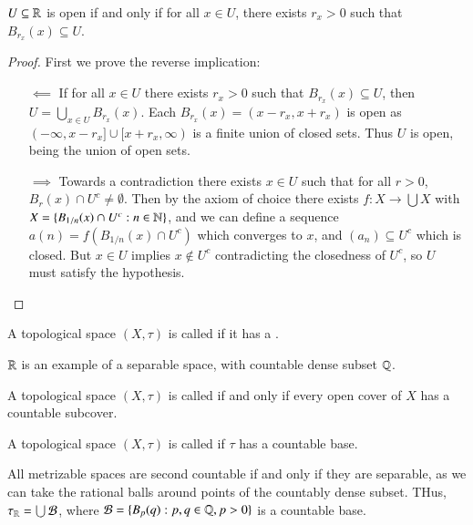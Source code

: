 \begin{prop}
    $U \subseteq \mathbb R$ is open if and only if for all $x \in U$, there exists $r_x > 0$ such that $B_{r_x}(x) \subseteq U$.
\end{prop}
\begin{proof}
    First we prove the reverse implication: \begin{itemize}
        \item[$\impliedby$] If for all $x \in U$ there exists $r_x > 0$ such that $B_{r_x}(x) \subseteq U$, then $U = \bigcup_{x \in U}B_{r_x}(x)$. Each $B_{r_x}(x) = (x-r_x,x+r_x)$ is open as $(-\infty,x-r_x]\cup[x+r_x,\infty)$ is a finite union of closed sets. Thus $U$ is open, being the union of open sets.
        \item[$\implies$] Towards a contradiction there exists $x \in U$ such that for all $r > 0$, $B_r(x) \cap U^c \neq \emptyset$. Then by the axiom of choice there exists $f:X\rightarrow \bigcup X$ with $X = \{B_{1/n}(x)\cap U^c:n \in \mathbb N\}$, and we can define a sequence $a(n) = f(B_{1/n}(x)\cap U^c)$ which converges to $x$, and $(a_n) \subseteq U^c$ which is closed. But $x \in U$ implies $x \notin U^c$ contradicting the closedness of $U^c$, so $U$ must satisfy the hypothesis.
    \end{itemize}
\end{proof}

\begin{defn}
    A topological space $(X,\tau)$ is called  if it has a .
\end{defn}

$\mathbb R$ is an example of a separable space, with countable dense subset $\mathbb Q$.

\begin{defn}
    A topological space $(X,\tau)$ is called  if and only if every open cover of $X$ has a countable subcover.
\end{defn}

\begin{defn}
    A topological space $(X,\tau)$ is called  if $\tau$ has a countable base.
\end{defn}

All metrizable spaces are second countable if and only if they are separable, as we can take the rational balls around points of the countably dense subset. THus, $\tau_{\mathbb R} = \bigcup \mathcal{B}$, where $\mathcal{B} = \{B_p(q):p,q \in \mathbb Q, p > 0\}$ is a countable base.

